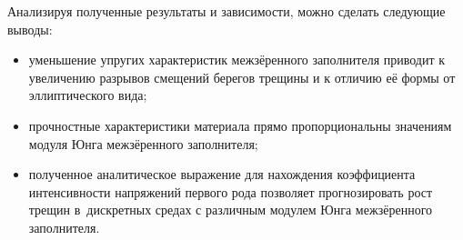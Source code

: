 








 Анализируя полученные результаты и зависимости, можно сделать следующие выводы:

\begin{itemize}

	\item[--] уменьшение упругих характеристик межзёренного заполнителя приводит к увеличению разрывов смещений берегов трещины и к отличию  её формы  от эллиптического вида;

	\item[--] прочностные характеристики материала прямо пропорциональны  значениям модуля Юнга межзёренного заполнителя;

	\item[--] полученное аналитическое выражение для нахождения коэффициента интенсивности напряжений первого рода позволяет прогнозировать рост трещин в~дискретных средах  с различным модулем  Юнга межзёренного заполнителя.

\end{itemize}











